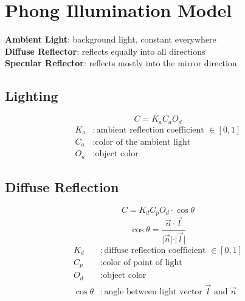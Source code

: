 \section{Phong Illumination Model}

\textbf{Ambient Light}: background light, constant everywhere \\
\textbf{Diffuse Reflector}: reflects equally into all directions \\
\textbf{Specular Reflector}: reflects mostly into the mirror direction

\subsection{Lighting}

$$C = K_a C_a O_d$$
\begin{align*}
    K_a & : \text{ambient reflection coefficient }\in [0,1] \\
    C_a & : \text{color of the ambient light}               \\
    O_a & : \text{object color}
\end{align*}

\subsection{Diffuse Reflection}

\begin{center}
\end{center}

$$C = K_d C_p O_d \cdot \cos{\theta}$$
$$\cos{\theta} = \frac{\vec{n} \cdot \vec{l}}{\vert \vec{n} \vert \cdot \vert \vec{l} \vert}$$
\begin{align*}
    K_d          & : \text{diffuse reflection coefficient }\in [0, 1]                 \\
    C_p          & : \text{color of point of light}                                   \\
    O_d          & : \text{object color}                                              \\
    \cos{\theta} & : \text{angle between light vector } \vec{l}  \text{ and } \vec{n} \\
\end{align*}

